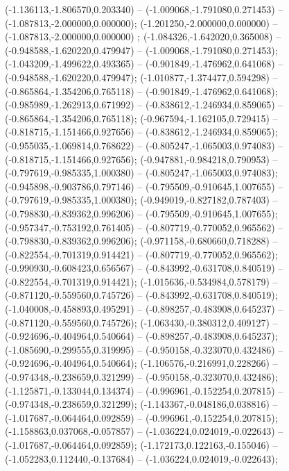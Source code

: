  (-1.136113,-1.806570,0.203340) -- (-1.009068,-1.791080,0.271453) -- (-1.087813,-2.000000,0.000000);
 (-1.201250,-2.000000,0.000000) -- (-1.087813,-2.000000,0.000000) ;
 (-1.084326,-1.642020,0.365008) -- (-0.948588,-1.620220,0.479947) -- (-1.009068,-1.791080,0.271453);
 (-1.043209,-1.499622,0.493365) -- (-0.901849,-1.476962,0.641068) -- (-0.948588,-1.620220,0.479947);
 (-1.010877,-1.374477,0.594298) -- (-0.865864,-1.354206,0.765118) -- (-0.901849,-1.476962,0.641068);
 (-0.985989,-1.262913,0.671992) -- (-0.838612,-1.246934,0.859065) -- (-0.865864,-1.354206,0.765118);
 (-0.967594,-1.162105,0.729415) -- (-0.818715,-1.151466,0.927656) -- (-0.838612,-1.246934,0.859065);
 (-0.955035,-1.069814,0.768622) -- (-0.805247,-1.065003,0.974083) -- (-0.818715,-1.151466,0.927656);
 (-0.947881,-0.984218,0.790953) -- (-0.797619,-0.985335,1.000380) -- (-0.805247,-1.065003,0.974083);
 (-0.945898,-0.903786,0.797146) -- (-0.795509,-0.910645,1.007655) -- (-0.797619,-0.985335,1.000380);
 (-0.949019,-0.827182,0.787403) -- (-0.798830,-0.839362,0.996206) -- (-0.795509,-0.910645,1.007655);
 (-0.957347,-0.753192,0.761405) -- (-0.807719,-0.770052,0.965562) -- (-0.798830,-0.839362,0.996206);
 (-0.971158,-0.680660,0.718288) -- (-0.822554,-0.701319,0.914421) -- (-0.807719,-0.770052,0.965562);
 (-0.990930,-0.608423,0.656567) -- (-0.843992,-0.631708,0.840519) -- (-0.822554,-0.701319,0.914421);
 (-1.015636,-0.534984,0.578179) -- (-0.871120,-0.559560,0.745726) -- (-0.843992,-0.631708,0.840519);
 (-1.040008,-0.458893,0.495291) -- (-0.898257,-0.483908,0.645237) -- (-0.871120,-0.559560,0.745726);
 (-1.063430,-0.380312,0.409127) -- (-0.924696,-0.404964,0.540664) -- (-0.898257,-0.483908,0.645237);
 (-1.085690,-0.299555,0.319995) -- (-0.950158,-0.323070,0.432486) -- (-0.924696,-0.404964,0.540664);
 (-1.106576,-0.216991,0.228266) -- (-0.974348,-0.238659,0.321299) -- (-0.950158,-0.323070,0.432486);
 (-1.125871,-0.133044,0.134374) -- (-0.996961,-0.152254,0.207815) -- (-0.974348,-0.238659,0.321299);
 (-1.143367,-0.048186,0.038816) -- (-1.017687,-0.064464,0.092859) -- (-0.996961,-0.152254,0.207815);
 (-1.158863,0.037068,-0.057857) -- (-1.036224,0.024019,-0.022643) -- (-1.017687,-0.064464,0.092859);
 (-1.172173,0.122163,-0.155046) -- (-1.052283,0.112440,-0.137684) -- (-1.036224,0.024019,-0.022643);
